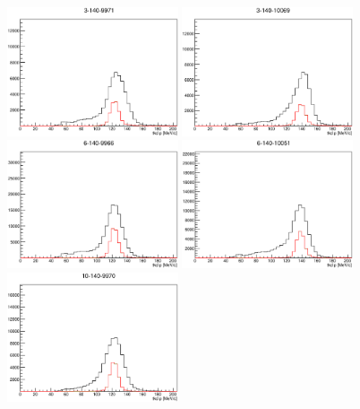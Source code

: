 \begin{figure}[!tbh]
    \centering
    \includegraphics*[width=0.45\textwidth]{analysis_plots/plots_3-140-full/tkd_p.eps}
    \includegraphics*[width=0.45\textwidth]{analysis_plots/plots_3-140-empty/tkd_p.eps}
    \includegraphics*[width=0.45\textwidth]{analysis_plots/plots_6-140-full/tkd_p.eps}
    \includegraphics*[width=0.45\textwidth]{analysis_plots/plots_6-140-empty/tkd_p.eps}
    \includegraphics*[width=0.45\textwidth]{analysis_plots/plots_10-140-full/tkd_p.eps}

\end{figure}
